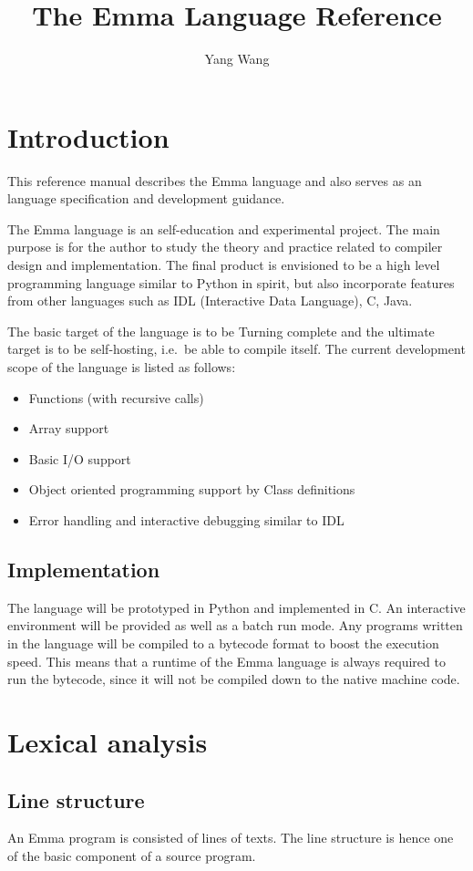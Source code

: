 \documentclass[10pt,a4paper]{article}
\author{Yang Wang}
\title{The Emma Language Reference}
\begin{document}
\section{Introduction}
This reference manual describes the Emma language and also serves as an  
language specification and development guidance.

The Emma language is an self-education and experimental project. 
The main purpose is for the author to study the theory and practice related
to compiler design and implementation. 
The final product is envisioned to be a high level programming language similar
to Python in spirit, but also incorporate features from other languages such as
IDL (Interactive Data Language), C, Java. 

The basic target of the language is to be Turning complete and the ultimate
target is to be self-hosting, i.e.\ be able to compile itself.
The current development scope of the language is listed as follows:

\begin{itemize}
\item Functions (with recursive calls)
\item Array support
\item Basic I/O support
\item Object oriented programming support by Class definitions
\item Error handling and interactive debugging similar to IDL
\end{itemize}


\subsection{Implementation}
The language will be prototyped in Python and implemented in C. 
An interactive environment will be provided as well as a batch
run mode. Any programs written in the language will be compiled
to a bytecode format to boost the execution speed. This means
that a runtime of the Emma language is always required to run
the bytecode, since it will not be compiled down to the native machine
code.

\pagebreak

\section{Lexical analysis}
\subsection{Line structure}
An Emma program is consisted of lines of texts. The line structure is
hence one of the basic component of a source program.
\end{document}
